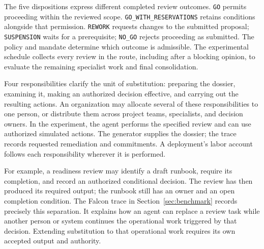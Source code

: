 The five dispositions express different completed review outcomes. \texttt{GO} permits
proceeding within the reviewed scope. \texttt{GO\_WITH\_RESERVATIONS} retains conditions
alongside that permission. \texttt{REWORK} requests changes to the submitted proposal;
\texttt{SUSPENSION} waits for a prerequisite; \texttt{NO\_GO} rejects proceeding as submitted.
The policy and mandate determine which outcome is admissible. The experimental schedule
collects every review in the route, including after a blocking opinion, to evaluate the
remaining specialist work and final consolidation.

Four responsibilities clarify the unit of substitution: preparing the dossier, examining
it, making an authorized decision effective, and carrying out the resulting actions.
An organization may allocate several of these responsibilities to one person, or distribute
them across project teams, specialists, and decision owners. In the experiment, the agent
performs the specified review and can use authorized simulated actions. The generator supplies
the dossier; the trace records requested remediation and commitments. A deployment's labor
account follows each responsibility wherever it is performed.

For example, a readiness review may identify a draft runbook, require its completion, and
record an authorized conditional decision. The review has then produced its required output;
the runbook still has an owner and an open completion condition. The Falcon trace in
Section~\ref{sec:benchmark} records precisely this separation. It explains how an agent can
replace a review task while another person or system continues the operational work triggered
by that decision. Extending substitution to that operational work requires its own accepted
output and authority.
